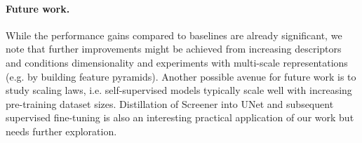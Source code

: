 \paragraph{Future work.} While the performance gains compared to baselines are already significant, we note that further improvements might be achieved from increasing descriptors and conditions dimensionality and experiments with multi-scale representations (e.g. by building feature pyramids). Another possible avenue for future work is to study scaling laws, i.e. self-supervised models typically scale well with increasing pre-training dataset sizes. Distillation of Screener into UNet and subsequent supervised fine-tuning is also an interesting practical application of our work but needs further exploration.
